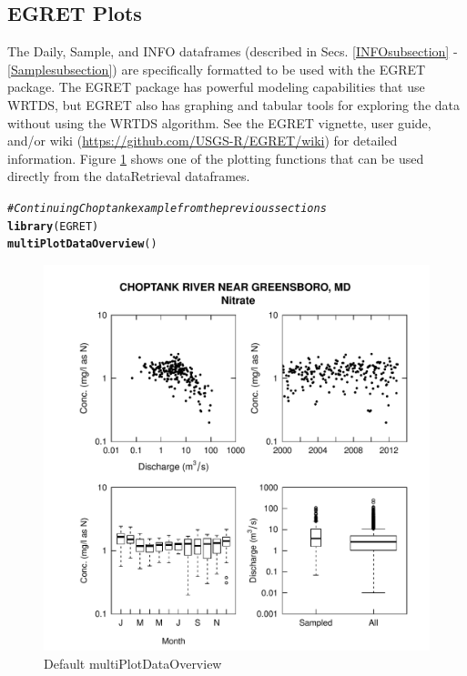\documentclass[a4paper,11pt]{article}\usepackage[]{graphicx}\usepackage[]{color}
\makeatletter
\def\maxwidth{ %
  \ifdim\Gin@nat@width>\linewidth
    \linewidth
  \else
    \Gin@nat@width
  \fi
}
\newcommand{\hlcom}[1]{\textcolor[rgb]{0.678,0.584,0.686}{\textit{#1}}}%
\newcommand{\hlstd}[1]{\textcolor[rgb]{0.345,0.345,0.345}{#1}}%
\newcommand{\hlkwd}[1]{\textcolor[rgb]{0.737,0.353,0.396}{\textbf{#1}}}%
\newenvironment{kframe}{%
 \def\at@end@of@kframe{}%
 \ifinner\ifhmode%
  \def\at@end@of@kframe{\end{minipage}}%
  \begin{minipage}{\columnwidth}%
 \fi\fi%
 \def\FrameCommand##1{\hskip\@totalleftmargin \hskip-\fboxsep
 \colorbox{shadecolor}{##1}\hskip-\fboxsep
     \hskip-\linewidth \hskip-\@totalleftmargin \hskip\columnwidth}%
 \MakeFramed {\advance\hsize-\width
   \@totalleftmargin\z@ \linewidth\hsize
   \@setminipage}}%
 {\par\unskip\endMakeFramed%
 \at@end@of@kframe}
\newenvironment{knitrout}{}{} %
\makeatother
\begin{document}
\FloatBarrier

\subsection{EGRET Plots}
The Daily, Sample, and INFO dataframes (described in Secs. \ref{INFOsubsection} - \ref{Samplesubsection}) are specifically formatted to be used with the EGRET package. The EGRET package has powerful modeling capabilities that use WRTDS, but EGRET also has graphing and tabular tools for exploring the data without using the WRTDS algorithm. See the EGRET vignette, user guide, and/or wiki (\url{https://github.com/USGS-R/EGRET/wiki}) for detailed information. Figure \ref{fig:egretEx} shows one of the plotting functions that can be used directly from the dataRetrieval dataframes.

\begin{knitrout}
\color{fgcolor}\begin{kframe}
\begin{alltt}
\hlcom{# Continuing Choptank example from the previous sections}
\hlkwd{library}\hlstd{(EGRET)}
\hlkwd{multiPlotDataOverview}\hlstd{()}
\end{alltt}
\end{kframe}\begin{figure}[]

\includegraphics[width=\maxwidth]{figure/egretEx} \caption[Default multiPlotDataOverview]{Default multiPlotDataOverview\label{fig:egretEx}}
\end{figure}


\end{knitrout}
\end{document}
